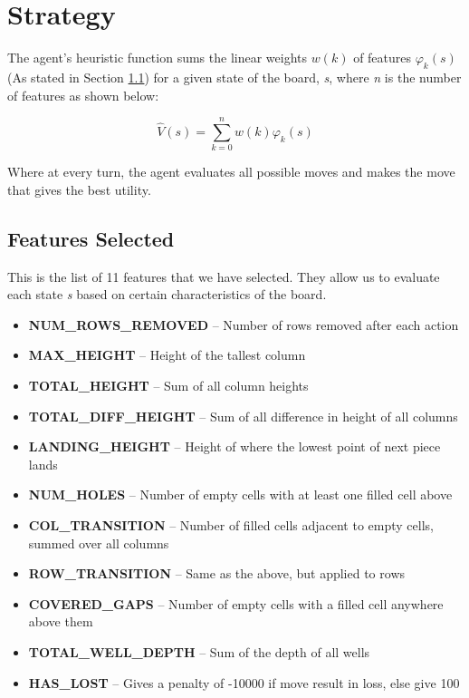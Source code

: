 \documentclass[a4paper,12pt,twocolumn]{article}
\begin{document}
\section{Strategy}
The agent's heuristic function sums the linear weights $w(k)$ of features $\varphi_k(s)$
(As stated in Section \ref{features_subsection}) for a given state of the board,
\textit{s}, where \textit{n} is the number of features as shown below:

\[
    \hat V(s) = \sum_{k=0}^{n}w(k)\varphi_k(s)
\]

Where at every turn, the agent evaluates all possible moves and makes the move
that gives the best utility.

\subsection{Features Selected}
\label{features_subsection}
This is the list of 11 features that we have selected. They allow us to
evaluate each state \textit{s} based on certain characteristics of the board.

\begin{itemize}
    \item \textbf{NUM\_ROWS\_REMOVED} -- Number of rows removed after each action
    \item \textbf{MAX\_HEIGHT} -- Height of the tallest column
    \item \textbf{TOTAL\_HEIGHT} -- Sum of all column heights
    \item \textbf{TOTAL\_DIFF\_HEIGHT} -- Sum of all difference in height of all columns
    \item \textbf{LANDING\_HEIGHT} -- Height of where the lowest point of next piece lands
    \item \textbf{NUM\_HOLES} -- Number of empty cells with at least one filled cell above
    \item \textbf{COL\_TRANSITION} -- Number of filled cells adjacent to empty cells,
        summed over all columns
    \item \textbf{ROW\_TRANSITION} -- Same as the above, but applied to rows
    \item \textbf{COVERED\_GAPS} -- Number of empty cells with a filled cell
        anywhere above them
    \item \textbf{TOTAL\_WELL\_DEPTH} -- Sum of the depth of all wells
    \item \textbf{HAS\_LOST} -- Gives a penalty of -10000 if move result in loss,
        else give 100
\end{itemize}
\end{document}
